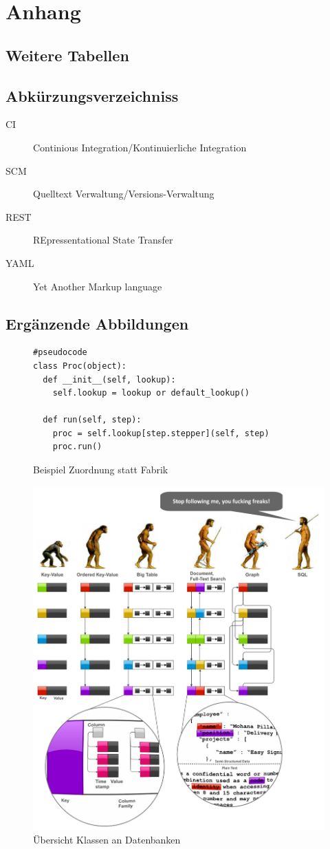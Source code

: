 \appendix
\chapter{Anhang}
\section{Weitere Tabellen}


\section{Abkürzungsverzeichniss}
\begin{description}
  \item[CI] Continious Integration/Kontinuierliche Integration
  \item[SCM] Quelltext Verwaltung/Versions-Verwaltung
  \item[REST] REpressentational State Transfer \cite{rest:definition}
  \item[YAML] Yet Another Markup language \cite{yaml:website}
\end{description}


\section{Ergänzende Abbildungen}

\begin{figure}[h]
\begin{verbatim}
#pseudocode
class Proc(object):
  def __init__(self, lookup):
    self.lookup = lookup or default_lookup()

  def run(self, step):
    proc = self.lookup[step.stepper](self, step)
    proc.run()
\end{verbatim}
\caption{Beispiel Zuordnung statt Fabrik}
\label{fig:fabrik-mapping}
\end{figure}


\begin{figure}
    \includegraphics[width=\textwidth]{images/databases-overview.png}
    \caption{Übersicht Klassen an Datenbanken}
    \label{fig:klassen-datenbanken}
\end{figure}
